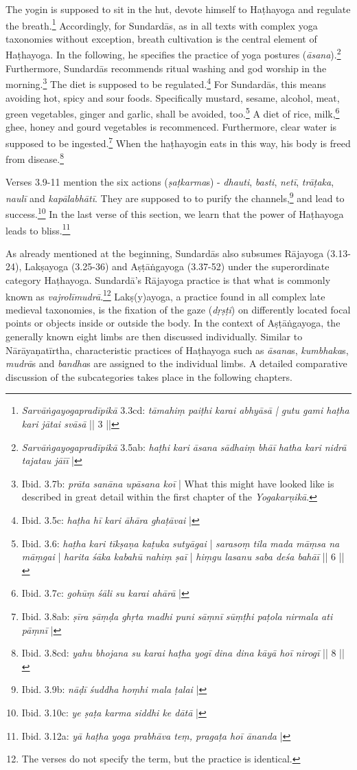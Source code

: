 The yogin is supposed to sit in the hut, devote himself to Haṭhayoga and regulate the breath.\footnote{\textit{Sarvāṅgayogapradīpikā} 3.3cd: \textit{tāmahiṃ paiṭhi karai abhyāsā | gutu gami haṭha kari jātai svāsā} || 3 ||} Accordingly, for Sundardās, as in all texts with complex yoga taxonomies without exception, breath cultivation is the central element of Haṭhayoga. In the following, he specifies the practice of yoga postures (\textit{āsana}).\footnote{\textit{Sarvāṅgayogapradīpikā} 3.5ab: \textit{haṭhi kari āsana sādhaiṃ bhāī} \textit{hatha kari nidrā tajatau jāīī} |} Furthermore, Sundardās recommends ritual washing and god worship in the morning.\footnote{Ibid. 3.7b: \textit{prāta sanāna upāsana koī} | What this might have looked like is described in great detail within the first chapter of the \textit{Yogakarṇikā}.} The diet is supposed to be regulated.\footnote{Ibid. 3.5c: \textit{haṭha hī kari āhāra ghaṭāvai} |} For Sundardās, this means avoiding hot, spicy and sour foods. Specifically mustard, sesame, alcohol, meat, green vegetables, ginger and garlic, shall be avoided, too.\footnote{Ibid. 3.6: \textit{haṭha kari tīkṣaṇa kaṭuka sutyāgai} | \textit{sarasoṃ tila mada māṃsa na māṃgai} | \textit{harita śāka kabahū nahiṃ ṣaī} | \textit{hiṃgu lasanu saba deśa bahāī} || 6 ||} A diet of rice, milk,\footnote{Ibid. 3.7c: \textit{gohūṃ śāli su karai ahārā} |} ghee, honey and gourd vegetables is recommenced. Furthermore, clear water is supposed to be ingested.\footnote{Ibid. 3.8ab: \textit{ṣīra ṣāṃḍa ghṛta madhi puni sāṃnī} \textit{sūṃṭhi paṭola nirmala ati pāṃnī} |} When the haṭhayogin eats in this way, his body is freed from disease.\footnote{Ibid. 3.8cd: \textit{yahu bhojana su karai haṭha yogī} \textit{dina dina kāyā hoī nirogī} || 8 ||}

Verses 3.9-11 mention the six actions (\textit{ṣaṭkarma}s) - \textit{dhauti}, \textit{basti}, \textit{netī}, \textit{trāṭaka}, \textit{naulī} and \textit{kapālabhātī}. They are supposed to to purify the channels,\footnote{Ibid. 3.9b: \textit{nāḍī śuddha hoṃhi mala ṭalai} |} and lead to success.\footnote{Ibid. 3.10c: \textit{ye ṣaṭa karma siddhi ke dātā} |} In the last verse of this section, we learn that the power of Haṭhayoga leads to bliss.\footnote{Ibid. 3.12a: \textit{yā haṭha yoga prabhāva teṃ, pragaṭa hoī ānanda} |}

As already mentioned at the beginning, Sundardās also subsumes Rājayoga (3.13-24), Lakṣayoga (3.25-36) and Aṣṭāṅgayoga (3.37-52) under the superordinate category Haṭhayoga. Sundardā's Rājayoga practice is that what is commonly known as \textit{vajrolīmudrā}.\footnote{The verses do not specify the term, but the practice is identical.} Lakṣ(y)ayoga, a practice found in all complex late medieval taxonomies, is the fixation of the gaze (\textit{dṛṣṭi}) on differently located focal points or objects inside or outside the body. In the context of Aṣṭāṅgayoga, the generally known eight limbs are then discussed individually. Similar to Nārāyaṇatīrtha, characteristic practices of Haṭhayoga such as \textit{āsana}s, \textit{kumbhaka}s, \textit{mudrā}s and \textit{bandha}s are assigned to the individual limbs. A detailed comparative discussion of the subcategories takes place in the following chapters.

